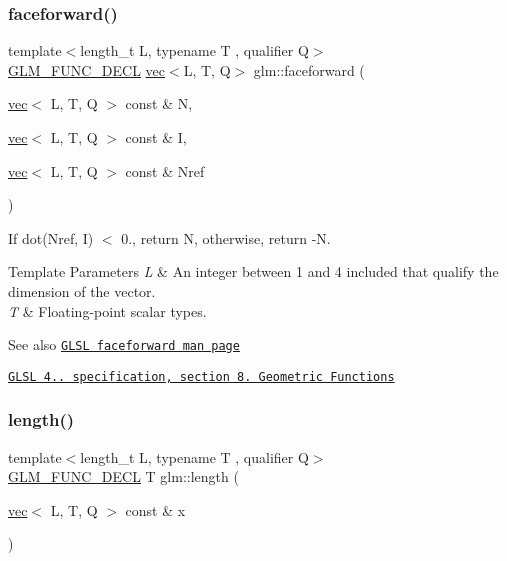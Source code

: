 \subsubsection{\texorpdfstring{faceforward()}{faceforward()}}
{\footnotesize\ttfamily template$<$length\+\_\+t L, typename T , qualifier Q$>$ \\
\mbox{\hyperlink{setup_8hpp_ab2d052de21a70539923e9bcbf6e83a51}{G\+L\+M\+\_\+\+F\+U\+N\+C\+\_\+\+D\+E\+CL}} \mbox{\hyperlink{structglm_1_1vec}{vec}}$<$L, T, Q$>$ glm\+::faceforward (\begin{DoxyParamCaption}\item[{\mbox{\hyperlink{structglm_1_1vec}{vec}}$<$ L, T, Q $>$ const \&}]{N,  }\item[{\mbox{\hyperlink{structglm_1_1vec}{vec}}$<$ L, T, Q $>$ const \&}]{I,  }\item[{\mbox{\hyperlink{structglm_1_1vec}{vec}}$<$ L, T, Q $>$ const \&}]{Nref }\end{DoxyParamCaption})}

If dot(\+Nref, I) $<$ 0., return N, otherwise, return -\/N.


\begin{DoxyTemplParams}{Template Parameters}
{\em L} & An integer between 1 and 4 included that qualify the dimension of the vector. \\
\hline
{\em T} & Floating-\/point scalar types.\\
\hline
\end{DoxyTemplParams}
\begin{DoxySeeAlso}{See also}
\href{http://www.opengl.org/sdk/docs/manglsl/xhtml/faceforward.xml}{\tt G\+L\+SL faceforward man page} 

\href{http://www.opengl.org/registry/doc/GLSLangSpec.4.20.8.pdf}{\tt G\+L\+SL 4.. specification, section 8. Geometric Functions} 
\end{DoxySeeAlso}
\mbox{\label{group__core__func__geometric_ga0cdabbb000834d994a1d6dc56f8f5263}} 
\subsubsection{\texorpdfstring{length()}{length()}}
{\footnotesize\ttfamily template$<$length\+\_\+t L, typename T , qualifier Q$>$ \\
\mbox{\hyperlink{setup_8hpp_ab2d052de21a70539923e9bcbf6e83a51}{G\+L\+M\+\_\+\+F\+U\+N\+C\+\_\+\+D\+E\+CL}} T glm\+::length (\begin{DoxyParamCaption}\item[{\mbox{\hyperlink{structglm_1_1vec}{vec}}$<$ L, T, Q $>$ const \&}]{x }\end{DoxyParamCaption})}

